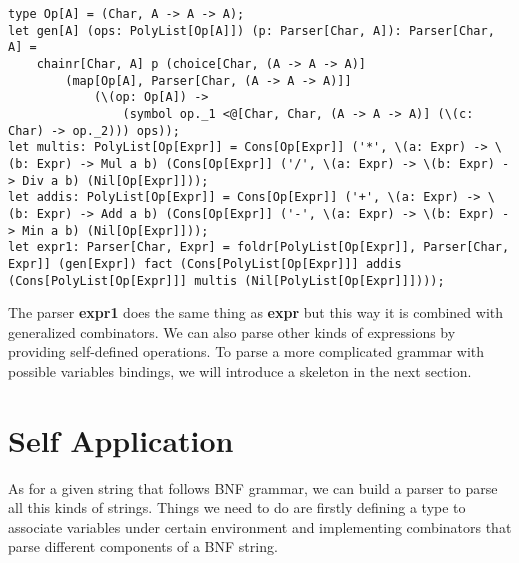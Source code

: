 \begin{lstlisting}
type Op[A] = (Char, A -> A -> A);
let gen[A] (ops: PolyList[Op[A]]) (p: Parser[Char, A]): Parser[Char, A] =
	chainr[Char, A] p (choice[Char, (A -> A -> A)] 
		(map[Op[A], Parser[Char, (A -> A -> A)]] 
			(\(op: Op[A]) -> 
				(symbol op._1 <@[Char, Char, (A -> A -> A)] (\(c: Char) -> op._2))) ops));
let multis: PolyList[Op[Expr]] = Cons[Op[Expr]] ('*', \(a: Expr) -> \(b: Expr) -> Mul a b) (Cons[Op[Expr]] ('/', \(a: Expr) -> \(b: Expr) -> Div a b) (Nil[Op[Expr]]));
let addis: PolyList[Op[Expr]] = Cons[Op[Expr]] ('+', \(a: Expr) -> \(b: Expr) -> Add a b) (Cons[Op[Expr]] ('-', \(a: Expr) -> \(b: Expr) -> Min a b) (Nil[Op[Expr]]));
let expr1: Parser[Char, Expr] = foldr[PolyList[Op[Expr]], Parser[Char, Expr]] (gen[Expr]) fact (Cons[PolyList[Op[Expr]]] addis (Cons[PolyList[Op[Expr]]] multis (Nil[PolyList[Op[Expr]]])));
\end{lstlisting}
The parser \textbf{expr1} does the same thing as \textbf{expr} but this way it is combined with generalized combinators. We can also parse other kinds of expressions by providing self-defined operations. To parse a more complicated grammar with possible variables bindings, we will introduce a skeleton in the next section.

\section{Self Application}
As for a given string that follows BNF grammar, we can build a parser to parse all this kinds of strings. Things we need to do are firstly defining a type to associate variables under certain environment and implementing combinators that parse different components of a BNF string.

